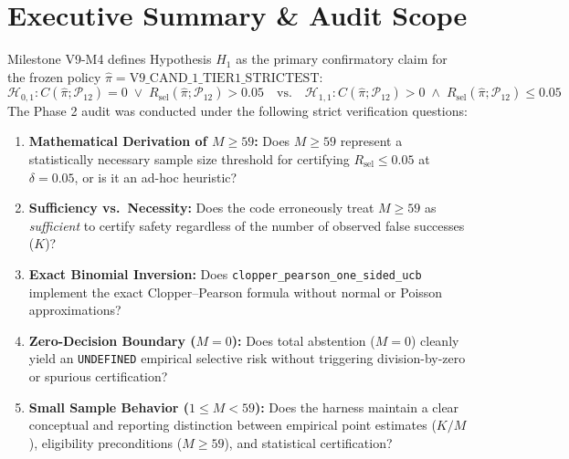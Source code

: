 \documentclass[10pt,a4paper]{article}
\begin{document}
\section{Executive Summary \& Audit Scope}
Milestone V9-M4 defines Hypothesis $H_1$ as the primary confirmatory claim for the frozen policy $\hat{\pi} = \text{V9\_CAND\_1\_TIER1\_STRICTEST}$:
\begin{equation}
\mathcal{H}_{0,1}: C(\hat{\pi}; \mathcal{P}_{12}) = 0 \;\lor\; R_{\mathrm{sel}}(\hat{\pi}; \mathcal{P}_{12}) > 0.05 \quad\text{vs.}\quad \mathcal{H}_{1,1}: C(\hat{\pi}; \mathcal{P}_{12}) > 0 \;\land\; R_{\mathrm{sel}}(\hat{\pi}; \mathcal{P}_{12}) \le 0.05
\end{equation}
The Phase 2 audit was conducted under the following strict verification questions:
\begin{enumerate}
    \item \textbf{Mathematical Derivation of $M \ge 59$:} Does $M \ge 59$ represent a statistically necessary sample size threshold for certifying $R_{\mathrm{sel}} \le 0.05$ at $\delta = 0.05$, or is it an ad-hoc heuristic?
    \item \textbf{Sufficiency vs.\ Necessity:} Does the code erroneously treat $M \ge 59$ as \textit{sufficient} to certify safety regardless of the number of observed false successes ($K$)?
    \item \textbf{Exact Binomial Inversion:} Does \texttt{clopper\_pearson\_one\_sided\_ucb} implement the exact Clopper--Pearson formula without normal or Poisson approximations?
    \item \textbf{Zero-Decision Boundary ($M = 0$):} Does total abstention ($M=0$) cleanly yield an \texttt{UNDEFINED} empirical selective risk without triggering division-by-zero or spurious certification?
    \item \textbf{Small Sample Behavior ($1 \le M < 59$):} Does the harness maintain a clear conceptual and reporting distinction between empirical point estimates ($K/M$), eligibility preconditions ($M \ge 59$), and statistical certification?
\end{enumerate}
\end{document}
